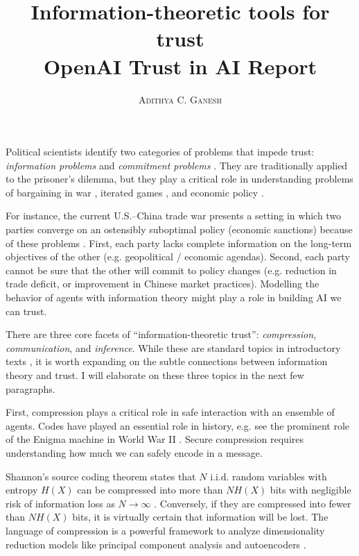 \documentclass[11pt]{article}
\title{Information-theoretic tools for trust \\ \vspace{0.3cm} OpenAI Trust in AI Report}
\author{\textsc{Adithya C. Ganesh}}
\begin{document}
Political scientists identify two categories of problems that impede trust: {\it information problems} and {\it commitment problems} \cite{frieden2010world}.  They are traditionally applied to the prisoner's dilemma, but they play a critical role in understanding problems of bargaining in war \cite{lake2010two}, iterated games \cite{axelrod1981evolution}, and economic policy \cite{panagariya2003international}.

For instance, the current U.S.--China trade war presents a setting in which two parties converge on an ostensibly suboptimal policy (economic sanctions) because of these problems \cite{liu2018understanding} \cite{}.  First, each party lacks complete information on the long-term objectives of the other (e.g. geopolitical / economic agendas).  Second, each party cannot be sure that the other will commit to policy changes (e.g. reduction in trade deficit, or improvement in Chinese market practices).  Modelling the behavior of agents with information theory might play a role in building AI we can trust. 

There are three core facets of ``information-theoretic trust'': {\it compression}, {\it communication}, and {\it inference}.  While these are standard topics in introductory texts \cite{cover2012elements}\cite{mackay2003information}, it is worth expanding on the subtle connections between information theory and trust.  I will elaborate on these three topics in the next few paragraphs.

First, compression plays a critical role in safe interaction with an ensemble of agents.  Codes have played an essential role in history, e.g. see the prominent role of the Enigma machine in World War II \cite{booss2003mathematics}.  Secure compression requires understanding how much we can safely encode in a message.

Shannon's source coding theorem states that $N$ i.i.d. random variables with entropy $H(X)$ can be compressed into more than $N H(X)$ bits with negligible risk of information loss as $N \to \infty$ \cite{shannon1948mathematical}\cite{mackay2003information}.  Conversely, if they are compressed into fewer than $N H(X)$ bits, it is virtually certain that information will be lost.  The language of compression is a powerful framework to analyze dimensionality reduction models like principal component analysis \cite{geiger2012relative} and autoencoders \cite{doersch2016tutorial}.
\end{document}
